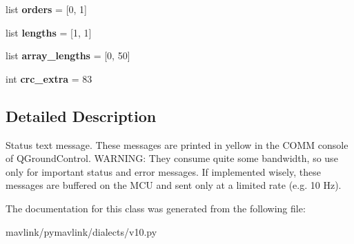 \begin{DoxyCompactItemize}
\mbox{\label{classpymavlink_1_1dialects_1_1v10_1_1MAVLink__statustext__message_aaa3aad2e90ceac97567dbc6946ed653f}} 
list {\bfseries orders} = \mbox{[}0, 1\mbox{]}
\item 
\mbox{\label{classpymavlink_1_1dialects_1_1v10_1_1MAVLink__statustext__message_ab1ea41c79d3b06c6e90e8b4c958c3f69}} 
list {\bfseries lengths} = \mbox{[}1, 1\mbox{]}
\item 
\mbox{\label{classpymavlink_1_1dialects_1_1v10_1_1MAVLink__statustext__message_a9d8dd0e3bc705b87ef29d7c87e12efbb}} 
list {\bfseries array\+\_\+lengths} = \mbox{[}0, 50\mbox{]}
\item 
\mbox{\label{classpymavlink_1_1dialects_1_1v10_1_1MAVLink__statustext__message_a299ba60bab13e4d9f5af525b6c91bcc2}} 
int {\bfseries crc\+\_\+extra} = 83
\end{DoxyCompactItemize}


\subsection{Detailed Description}
\begin{DoxyVerb}Status text message. These messages are printed in yellow in
the COMM console of QGroundControl. WARNING: They consume
quite some bandwidth, so use only for important status and
error messages. If implemented wisely, these messages are
buffered on the MCU and sent only at a limited rate (e.g. 10
Hz).
\end{DoxyVerb}
 

The documentation for this class was generated from the following file\+:\begin{DoxyCompactItemize}
\item 
mavlink/pymavlink/dialects/v10.\+py\end{DoxyCompactItemize}

